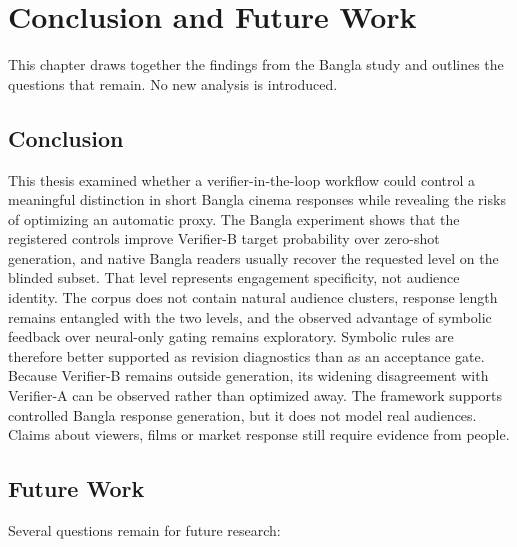 
\chapter{Conclusion and Future Work}
\label{chap:conclusion}

This chapter draws together the findings from the Bangla study and outlines the questions that remain. No new analysis is introduced.

\section{Conclusion}
\label{sec:ch8-conclusion}

This thesis examined whether a verifier-in-the-loop workflow could control a meaningful distinction in short Bangla cinema responses while revealing the risks of optimizing an automatic proxy. The Bangla experiment shows that the registered controls improve Verifier-B target probability over zero-shot generation, and native Bangla readers usually recover the requested level on the blinded subset. That level represents engagement specificity, not audience identity. The corpus does not contain natural audience clusters, response length remains entangled with the two levels, and the observed advantage of symbolic feedback over neural-only gating remains exploratory. Symbolic rules are therefore better supported as revision diagnostics than as an acceptance gate. Because Verifier-B remains outside generation, its widening disagreement with Verifier-A can be observed rather than optimized away. The framework supports controlled Bangla response generation, but it does not model real audiences. Claims about viewers, films or market response still require evidence from people.

\section{Future Work}
\label{sec:ch8-future-work}

Several questions remain for future research:

